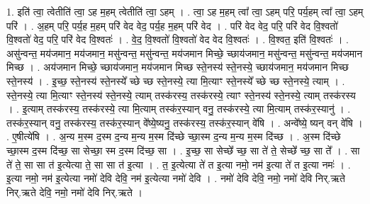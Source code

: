 \documentclass[17pt]{extarticle}
\begin{document}
1. इति॑ त्वा॒ त्वेतीति॑ त्वा॒ ऽह म॒हम् त्वेतीति॑ त्वा॒ ऽहम् । . त्वा॒ ऽह म॒हम् त्वा᳚ त्वा॒ ऽहम् परि॒ पर्य॒हम् त्वा᳚ त्वा॒ ऽहम् परि॑ । . अ॒हम् परि॒ पर्य॒ह म॒हम् परि॑ वेद वेद॒ पर्य॒ह म॒हम् परि॑ वेद । . परि॑ वेद वेद॒ परि॒ परि॑ वेद वि॒श्वतो॑ वि॒श्वतो॑ वेद॒ परि॒ परि॑ वेद वि॒श्वतः॑ । . वे॒द॒ वि॒श्वतो॑ वि॒श्वतो॑ वेद वेद वि॒श्वतः॑ । . वि॒श्वत॒ इति॑ वि॒श्वतः॑ । . असु॑न्वन्त॒ मय॑जमान॒ मय॑जमान॒ मसु॑न्वन्त॒ मसु॑न्वन्त॒ मय॑जमान मिच्छे॒ च्छाय॑जमान॒ मसु॑न्वन्त॒ मसु॑न्वन्त॒ मय॑जमान मिच्छ । . अय॑जमान मिच्छे॒ च्छाय॑जमान॒ मय॑जमान मिच्छ स्ते॒नस्य॑ स्ते॒नस्ये॒ च्छाय॑जमान॒ मय॑जमान मिच्छ स्ते॒नस्य॑ । . इ॒च्छ॒ स्ते॒नस्य॑ स्ते॒नस्ये᳚ च्छे च्छ स्ते॒नस्ये॒ त्या मि॒त्याꣳ स्ते॒नस्ये᳚ च्छे च्छ स्ते॒नस्ये॒ त्याम् । . स्ते॒नस्ये॒ त्या मि॒त्याꣳ स्ते॒नस्य॑ स्ते॒नस्ये॒ त्याम् तस्क॑रस्य॒ तस्क॑रस्ये॒ त्याꣳ स्ते॒नस्य॑ स्ते॒नस्ये॒ त्याम् तस्क॑रस्य । . इ॒त्याम् तस्क॑रस्य॒ तस्क॑रस्ये॒ त्या मि॒त्याम् तस्क॑र॒स्यान् वनु॒ तस्क॑रस्ये॒ त्या मि॒त्याम् तस्क॑र॒स्यानु॑ । . तस्क॑र॒स्यान् वनु॒ तस्क॑रस्य॒ तस्क॑र॒स्यान् वे᳚ष्ये॒ष्यनु॒ तस्क॑रस्य॒ तस्क॑र॒स्यान् वे॑षि । . अन्वे᳚ष्ये॒ ष्यन् वन् वे॑षि । . ए॒षीत्ये॑षि । . अ॒न्य म॒स्म द॒स्म द॒न्य म॒न्य म॒स्म दि॑च्छे च्छा॒स्म द॒न्य म॒न्य म॒स्म दि॑च्छ । . अ॒स्म दि॑च्छे च्छा॒स्म द॒स्म दि॑च्छ॒ सा सेच्छा॒ स्म द॒स्म दि॑च्छ॒ सा । . इ॒च्छ॒ सा सेच्छे᳚ च्छ॒ सा ते॑ ते॒ सेच्छे᳚ च्छ॒ सा ते᳚ । . सा ते॑ ते॒ सा सा त॑ इ॒त्येत्या ते॒ सा सा त॑ इ॒त्या । . त॒ इ॒त्येत्या ते॑ त इ॒त्या नमो॒ नम॑ इ॒त्या ते॑ त इ॒त्या नमः॑ । . इ॒त्या नमो॒ नम॑ इ॒त्येत्या नमो॑ देवि देवि॒ नम॑ इ॒त्येत्या नमो॑ देवि । . नमो॑ देवि देवि॒ नमो॒ नमो॑ देवि निर्.ऋते निर्.ऋते देवि॒ नमो॒ नमो॑ देवि निर्.ऋते । \newline
\end{document}
